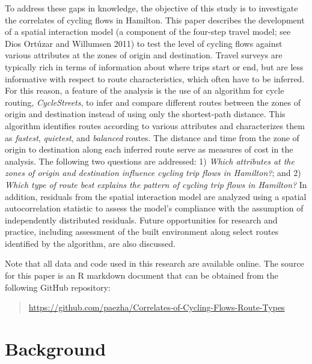 \documentclass[smallextended]{svjour3}       %
\begin{document}
To address these gaps in knowledge, the objective of this study is to
investigate the correlates of cycling flows in Hamilton. This paper
describes the development of a spatial interaction model (a component of
the four-step travel model; see Dios Ortúzar and Willumsen 2011) to test
the level of cycling flows against various attributes at the zones of
origin and destination. Travel surveys are typically rich in terms of
information about where trips start or end, but are less informative
with respect to route characteristics, which often have to be inferred.
For this reason, a feature of the analysis is the use of an algorithm
for cycle routing, \emph{CycleStreets}, to infer and compare different
routes between the zones of origin and destination instead of using only
the shortest-path distance. This algorithm identifies routes according
to various attributes and characterizes them as \emph{fastest},
\emph{quietest}, and \emph{balanced} routes. The distance and time from
the zone of origin to destination along each inferred route serve as
measures of cost in the analysis. The following two questions are
addressed: 1) \emph{Which attributes at the zones of origin and
destination influence cycling trip flows in Hamilton?}; and 2)
\emph{Which type of route best explains the pattern of cycling trip
flows in Hamilton?} In addition, residuals from the spatial interaction
model are analyzed using a spatial autocorrelation statistic to assess
the model's compliance with the assumption of independently distributed
residuals. Future opportunities for research and practice, including
assessment of the built environment along select routes identified by
the algorithm, are also discussed.

Note that all data and code used in this research are available online.
The source for this paper is an R markdown document that can be obtained
from the following GitHub repository:

\begin{quote}
\url{https://github.com/paezha/Correlates-of-Cycling-Flows-Route-Types}
\end{quote}

\hypertarget{sec:background}{%
\section{Background}\label{sec:background}}
\end{document}
